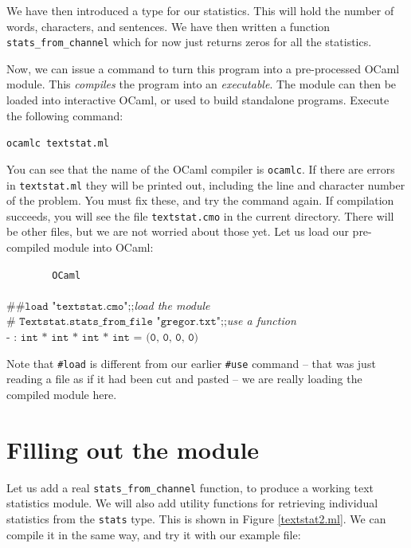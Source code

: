 \documentclass[]{book}
\newcommand{\smspace}{\vspace{4mm}}
\begin{document}
We have then introduced a type for our statistics. This will hold the number of words, characters, and sentences. We have then written a function \texttt{stats\_from\_channel} which for now just returns zeros for all the statistics.

Now, we can issue a command to turn this program into a pre-processed OCaml module. This \textit{compiles} the program into an \textit{executable}. The module can then be loaded into interactive OCaml, or used to build standalone programs. Execute the following command:

\smspace
\texttt{ocamlc textstat.ml}
\smspace

\noindent You can see that the name of the OCaml compiler is \texttt{ocamlc}. If there are errors in \texttt{textstat.ml} they will be printed out, including the line and character number of the problem. You must fix these, and try the command again. If compilation succeeds, you will see the file \texttt{textstat.cmo} in the current directory. There will be other files, but we are not worried about those yet. Let us load our pre-compiled module into OCaml:

\smspace
\noindent\verb!        OCaml!\\
\noindent\\
\noindent$\texttt{\# \#load "textstat.cmo";;}$\hfill\textit{load the module}\\
\noindent$\texttt{\#~Textstat.stats\_from\_file "gregor.txt";;}$\hfill\textit{use a function}\\
\noindent$\texttt{- :\ int * int * int * int = (0, 0, 0, 0)}$\hfill\vphantom{g}
\smspace

\noindent Note that \texttt{\#load} is different from our earlier \texttt{\#use} command -- that was just reading a file as if it had been cut and pasted -- we are really loading the compiled module here.

\section*{Filling out the module}

Let us add a real \texttt{stats\_from\_channel} function, to produce a working text statistics module. We will also add utility functions for retrieving individual statistics from the \texttt{stats} type. This is shown in Figure \ref{textstat2.ml}. We can compile it in the same way, and try it with our example file:
\end{document}
